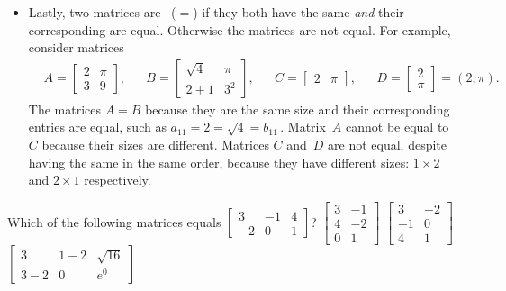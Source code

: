 \begin{itemize}
\item Lastly, two matrices are ~(\(=\)) if they both have the same  \emph{and} their corresponding  are equal.
Otherwise the matrices are not equal.
For example, consider matrices
\begin{align*}&
A=\begin{bmatrix} 2&\pi\\3&9 \end{bmatrix},&&
B=\begin{bmatrix} \sqrt4&\pi\\2+1&3^2 \end{bmatrix},&&
C=\begin{bmatrix} 2&\pi \end{bmatrix},&&
D=\begin{bmatrix} 2\\\pi \end{bmatrix}=(2,\pi).
\end{align*}
The matrices \(A=B\) because they are the same size and their  corresponding entries are equal, such as \(a_{11}=2=\sqrt4=b_{11}\)\,.
Matrix~\(A\) cannot be equal to~\(C\) because their sizes are different.
Matrices \(C\) and~\(D\) are not equal, despite having the same  in the same order, because they have different sizes: \(1\times 2\) and \(2\times 1\) respectively.

\end{itemize}



\begin{activity}
Which of the following matrices equals \(\begin{bmatrix}  3&-1&4
\\-2&0&1\end{bmatrix}\)?
{\(\begin{bmatrix} 3&-1\\4
&-2\\0&1 \end{bmatrix}\)}
{\(\begin{bmatrix} 3&-2\\-1&0\\4&1 \end{bmatrix}\)}
{\(\begin{bmatrix} 3&1-2&\sqrt{16}
\\3-2&0&e^0 \end{bmatrix}\)}
\end{activity}







